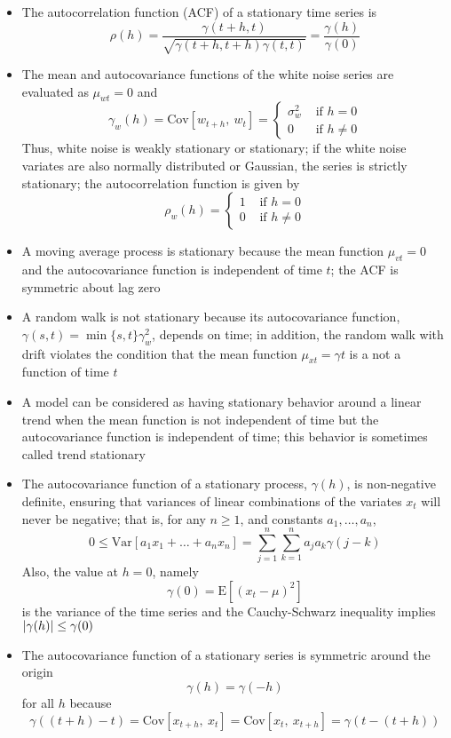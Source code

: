 \documentclass[12pt]{article}
\newcommand{\expe}[1]{\text{E}\left[ #1 \right]}
\renewcommand{\var}[1]{\text{Var}\left[ #1 \right]}
\newcommand{\cov}[2]{\text{Cov}\left[#1, ~#2\right]}
\begin{document}
\begin{itemize}
\item The autocorrelation function (ACF) of a stationary time series is $$ \rho(h) = \frac{\gamma(t+h, t)}{\sqrt{\gamma(t+h, t+h)\gamma(t,t)}} = \frac{\gamma(h)}{\gamma(0)} $$ 
\item The mean and autocovariance functions of the white noise series are evaluated as $\mu_{wt} = 0$ and $$ \gamma_w(h) = \cov{w_{t+h}}{w_t} = \begin{cases} \sigma^2_w &\text{ if } h = 0 \\ 0 &\text{ if } h \neq 0 \end{cases} $$ 
Thus, white noise is weakly stationary or stationary; if the white noise variates are also normally distributed or Gaussian, the series is strictly stationary; the autocorrelation function is given by $$ \rho_w(h) = \begin{cases} 1 &\text{ if } h = 0 \\ 0 &\text{ if } h \neq 0 \end{cases} $$ 
\item A moving average process is stationary because the mean function $\mu_{vt} = 0$ and the autocovariance function is independent of time $t$; the ACF is symmetric about lag zero
\item A random walk is not stationary because its autocovariance function, $\gamma(s,t) = \min\{s,t\}\gamma^2_w$, depends on time; in addition, the random walk with drift violates the condition that the mean function $\mu_{xt} = \gamma t$ is a not a function of time $t$ 
\item A model can be considered as having stationary behavior around a linear trend when the mean function is not independent of time but the autocovariance function is independent of time; this behavior is sometimes called trend stationary 
\item The autocovariance function of a stationary process, $\gamma(h)$, is non-negative definite, ensuring that variances of linear combinations of the variates $x_t$ will never be negative; that is, for any $n \geq 1$, and constants $a_1,\dots,a_n$, $$ 0 \leq \var{a_1x_1 + \dots + a_nx_n} = \sum_{j=1}^n \sum_{k=1}^n a_j a_k \gamma(j-k) $$ Also, the value at $h=0$, namely $$ \gamma(0) = \expe{(x_t - \mu)^2}$$ is the variance of the time series and the Cauchy-Schwarz inequality implies $\abs{\gamma(h)} \leq \gamma(0) $ 
\item The autocovariance function of a stationary series is symmetric around the origin $$ \gamma(h) = \gamma(-h) $$ for all $h$ because $$ \gamma((t+h) - t) = \cov{x_{t+h}}{x_t} = \cov{x_t}{x_{t+h}} = \gamma(t - (t+h)) $$ 

\end{itemize}
\end{document}
